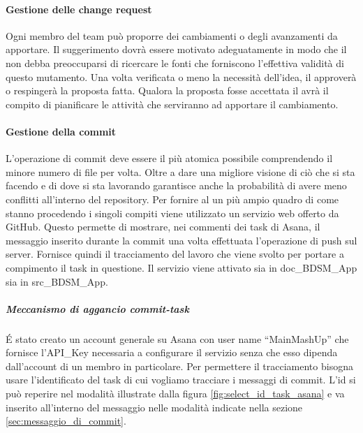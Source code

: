 			\paragraph{Gestione delle change request}
			Ogni membro del team può proporre dei cambiamenti o degli avanzamenti da apportare. Il suggerimento dovrà essere motivato adeguatamente in modo che il \roleProjectManager{} non debba preoccuparsi di ricercare le fonti che forniscono l'effettiva validità di questo mutamento. \newline
			Una volta verificata o meno la necessità dell'idea, il \roleProjectManager{} approverà o respingerà la proposta fatta. \newline
			Qualora la proposta fosse accettata il \roleProjectManager{} avrà il compito di pianificare le attività che serviranno ad apportare il cambiamento.

			\paragraph{Gestione della commit}
			L'operazione di commit deve essere il più atomica possibile comprendendo il minore numero di file per volta. Oltre a dare una migliore visione di ciò che si sta facendo e di dove si sta lavorando garantisce anche la probabilità di avere meno conflitti all'interno del repository. \newline
			Per fornire al \roleProjectManager{} un più ampio quadro di come stanno procedendo i singoli compiti viene utilizzato un servizio web offerto da GitHub. \newline
			Questo permette di mostrare, nei commenti dei task di Asana, il messaggio inserito durante la commit una volta effettuata l'operazione di push sul server. \newline
			Fornisce quindi il tracciamento del lavoro che viene svolto per portare a compimento il task in questione.
			Il servizio viene attivato sia in doc\_BDSM\_App sia in src\_BDSM\_App.

				\subparagraph{Meccanismo di aggancio commit-task} %
				\label{subp:meccanismo_di_aggancio_commit_task}
				\'E stato creato un account generale su Asana con user name ``MainMashUp'' che fornisce l'API\_Key necessaria a configurare il servizio senza che esso dipenda dall'account di un membro in particolare. \newline
				Per permettere il tracciamento bisogna usare l'identificato del task di cui vogliamo tracciare i messaggi di commit.\newline
				L'id si può reperire nel modalità illustrate dalla figura \ref{fig:select_id_task_asana} e va inserito all'interno del messaggio nelle modalità indicate nella sezione \ref{sec:messaggio_di_commit}.

